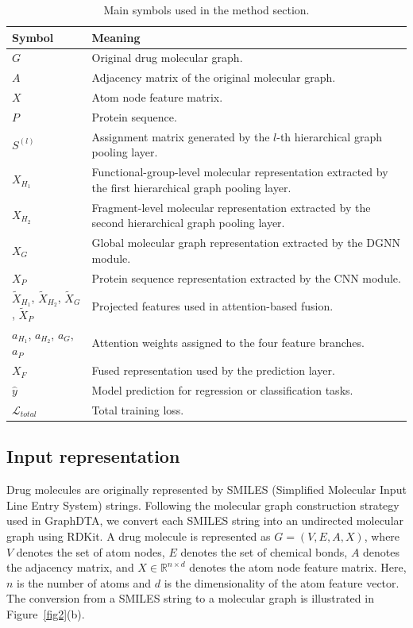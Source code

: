 \documentclass[pdflatex,sn-mathphys-num]{sn-jnl}%
\theoremstyle{thmstyleone}%
\theoremstyle{thmstyletwo}%
\theoremstyle{thmstylethree}%
\begin{document}
\begin{table}[!t]
\caption{Main symbols used in the method section.\label{table:notation}}
\centering
\begin{tabular}{p{}p{}}
\toprule
Symbol & Meaning \\
\midrule
$G$ & Original drug molecular graph. \\
$A$ & Adjacency matrix of the original molecular graph. \\
$X$ & Atom node feature matrix. \\
$P$ & Protein sequence. \\
$S^{(l)}$ & Assignment matrix generated by the $l$-th hierarchical graph pooling layer. \\
$X_{H_1}$ & Functional-group-level molecular representation extracted by the first hierarchical graph pooling layer. \\
$X_{H_2}$ & Fragment-level molecular representation extracted by the second hierarchical graph pooling layer. \\
$X_G$ & Global molecular graph representation extracted by the DGNN module. \\
$X_P$ & Protein sequence representation extracted by the CNN module. \\
$\tilde{X}_{H_1}$, $\tilde{X}_{H_2}$, $\tilde{X}_G$, $\tilde{X}_P$ & Projected features used in attention-based fusion. \\
$a_{H_1}$, $a_{H_2}$, $a_G$, $a_P$ & Attention weights assigned to the four feature branches. \\
$X_F$ & Fused representation used by the prediction layer. \\
$\hat{y}$ & Model prediction for regression or classification tasks. \\
$\mathcal{L}_{total}$ & Total training loss. \\
\bottomrule
\end{tabular}
\end{table}



\subsection{Input representation}\label{subsec:input_representation}
Drug molecules are originally represented by SMILES (Simplified Molecular Input Line Entry System) strings. Following the molecular graph construction strategy used in GraphDTA\cite{nguyen2021graphdta}, we convert each SMILES string into an undirected molecular graph using RDKit\cite{landrum2006rdkit}. A drug molecule is represented as $G=(V,E,A,X)$, where $V$ denotes the set of atom nodes, $E$ denotes the set of chemical bonds, $A$ denotes the adjacency matrix, and $X\in\mathbb{R}^{n\times d}$ denotes the atom node feature matrix. Here, $n$ is the number of atoms and $d$ is the dimensionality of the atom feature vector. The conversion from a SMILES string to a molecular graph is illustrated in Figure~\ref{fig2}(b).
\end{document}
